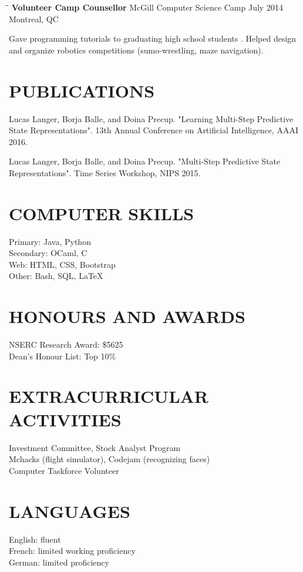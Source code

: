 \documentclass{res}
\begin{document}
\begin{resume}
   \begin{tabbing}
   \hspace{2.3in}\= \hspace{2.6in}\= \kill %
    {\bf Volunteer Camp Counsellor} \> McGill Computer Science Camp \> July 2014\\
                          \>Montreal, QC
   \end{tabbing}\vspace{-20pt}
    Gave programming tutorials to graduating high school students	. Helped design and organize robotics competitions (sumo-wrestling, maze navigation). 

\section{PUBLICATIONS}
	Lucas Langer, Borja Balle, and Doina Precup. "Learning Multi-Step Predictive State Representations". 13th Annual Conference on Artificial Intelligence, AAAI 2016.

	Lucas Langer, Borja Balle, and Doina Precup. "Multi-Step Predictive State Representations". Time Series Workshop, NIPS 2015.

\section{COMPUTER SKILLS}          
	Primary: Java, Python  \\
	Secondary: OCaml, C \\
	Web: HTML, CSS, Bootstrap \\
	Other: Bash, SQL, LaTeX        
 
\section{HONOURS AND AWARDS}          
    NSERC Research Award: \$5625   \\      
    Dean's Honour List: Top 10\%       
 
\section{EXTRACURRICULAR ACTIVITIES}
	Investment Committee, Stock Analyst Program  \\ 
	Mchacks (flight simulator), Codejam (recognizing faces)\\   
    Computer Taskforce Volunteer
    
\section{LANGUAGES}
	English: fluent  \\
	French: limited working proficiency \\
	German: limited proficiency

\end{resume}
\end{document}
